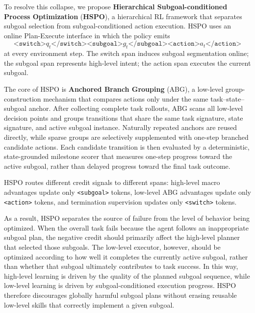 \documentclass{article}
\newcommand{\wei}[1]{\textcolor{red}{#1}}
\begin{document}



To resolve this collapse, we propose \textbf{Hierarchical Subgoal-conditioned Process Optimization} (\textbf{HSPO}), a hierarchical RL framework that separates subgoal selection from subgoal-conditioned action execution. HSPO uses an online Plan-Execute interface in which the policy emits
\[
\texttt{<switch>}q_t\texttt{</switch>}
\texttt{<subgoal>}g_t\texttt{</subgoal>}
\texttt{<action>}a_t\texttt{</action>}
\]
at every environment step. The switch span induces subgoal segmentation online; the subgoal span represents high-level intent; the action span executes the current subgoal. 

The core of HSPO is \textbf{Anchored Branch Grouping} (ABG), a low-level group-construction mechanism that compares actions only under the same task--state--subgoal anchor. After collecting complete task rollouts, ABG scans all low-level decision points and groups transitions that share the same task signature, state signature, and active subgoal instance. Naturally repeated anchors are reused directly, while sparse groups are selectively supplemented with one-step branched candidate actions. Each candidate transition is then evaluated by a deterministic, state-grounded milestone scorer that measures one-step progress toward the active subgoal, rather than delayed progress toward the final task outcome.

HSPO routes different credit signals to different spans: high-level macro advantages update only \texttt{<subgoal>} tokens, low-level ABG advantages update only \texttt{<action>} tokens, and termination supervision updates only \texttt{<switch>} tokens.

As a result, HSPO separates the source of failure from the level of behavior being optimized. When the overall task fails because the agent follows an inappropriate subgoal plan, the negative credit should primarily affect the high-level planner that selected those subgoals. The low-level executor, however, should be optimized according to how well it completes the currently active subgoal, rather than whether that subgoal ultimately contributes to task success. In this way, high-level learning is driven by the quality of the planned subgoal sequence, while low-level learning is driven by subgoal-conditioned execution progress. HSPO therefore discourages globally harmful subgoal plans without erasing reusable low-level skills that correctly implement a given subgoal.
\end{document}
